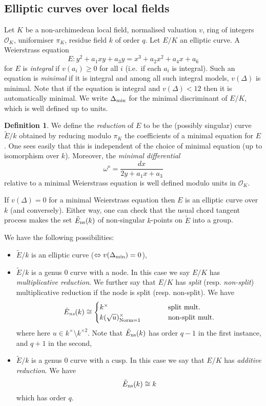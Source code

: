 \documentclass[12pt]{amsart}
\numberwithin{equation}{section}
\theoremstyle{remark}
\theoremstyle{definition}
\theoremstyle{definition}
\theoremstyle{definition}
\newtheorem{defi}[equation]{Definition}
\theoremstyle{definition}
\theoremstyle{definition}
\theoremstyle{definition}
\theoremstyle{definition}
\begin{document}
\subsection{Elliptic curves over local fields}

Let $K$ be a non-archimedean local field, normalised valuation $v$, ring of integers $\mathcal{O}_K$, uniformiser $\pi_K$, residue field $k$ of order $q$. Let $E/K$ an elliptic curve. A Weierstrass equation 
\[E:y^2+a_1xy+a_3y=x^3+a_2x^2+a_4x+a_6\]
for $E$ is \textit{integral} if $v(a_i)\geq 0$ for all $i$ (i.e.~if each $a_i$ is integral). Such an equation is \textit{minimal} if it is integral and among all such integral models, $v(\Delta)$ is minimal. Note that if the equation is integral and $v(\Delta)<12$ then it is automatically minimal. We write $\Delta_{\textup{min}}$ for the minimal discriminant of $E/K$, which is well defined up to units.



\begin{defi}
We define the \textit{reduction} of $E$ to be the (possibly singular) curve $\tilde{E}/k$ obtained by reducing modulo $\pi_K$ the coefficients of a minimal equation for $E$. One sees easily that this is independent of the choice of minimal equation (up to isomorphism over $k$). Moreover, the \textit{minimal differential}
\[\omega^o=\frac{dx}{2y+a_1x+a_3}\]
relative to a minimal Weierstrass equation is well defined modulo units in $\mathcal{O}_K$.
\end{defi}

If $v(\Delta)=0$ for a minimal Weierstrass equation then ${E}$ is an elliptic curve over $k$ (and conversely). Either way, one can check that the usual chord tangent process makes the set $\tilde{E}_{\textup{ns}}(k)$ of non-singular $k$-points on $\tilde{E}$ into a group.

 We have the following possibilities: 
 \begin{itemize}
 \item $\tilde{E}/k$ is an elliptic curve ($\Leftrightarrow v(\Delta_{\textup{min}})=0$),
 \item $\tilde{E}/k$ is a genus $0$ curve with a node. In this case we say $E/K$ has \textit{multiplicative reduction}. We further say that $E/K$ has \textit{split} (resp. \textit{non-split}) multiplicative reduction if the node is split (resp. non-split). We have
 \[\tilde{E}_{\textit{ns}}(k)\cong \begin{cases} k^{\times} ~~&\phantom{hello} \textup{split mult.}\\k(\sqrt{u})^{\times}_{\textup{Norm}=1}  ~~&\phantom{hello} \textup{non-split mult.} \end{cases}\]
 where here $u\in k^{\times}\setminus k^{\times 2}$. 
 Note that $\tilde{E}_{\textup{ns}}(k)$ has order $q-1$ in the first instance, and $q+1$ in the second,
 \item $\tilde{E}/k$ is a genus 0 curve with a cusp. In this case we say that $E/K$ has \textit{additive reduction}. We have
 \[\tilde{E}_{\textup{ns}}(k)\cong k\]
 which has order $q$.  
 \end{itemize}
\end{document}
